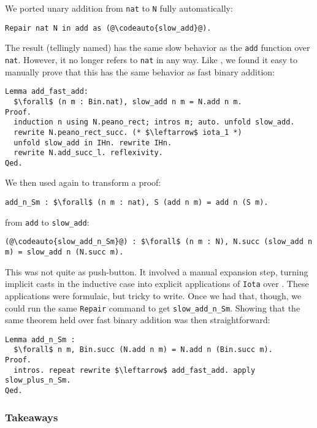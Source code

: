 We ported unary addition from \lstinline{nat} to \lstinline{N} fully automatically:

\begin{lstlisting}
Repair nat N in add as (@\codeauto{slow_add}@).
\end{lstlisting}
The result (tellingly named) has the same slow behavior as the \lstinline{add} function over \lstinline{nat}.
However, it no longer refers to \lstinline{nat} in any way.
Like \citet{magaud2000changing}, we found it easy to manually prove that
this has the same behavior as fast binary addition:

\begin{lstlisting}
Lemma add_fast_add:
  $\forall$ (n m : Bin.nat), slow_add n m = N.add n m.
Proof.
  induction n using N.peano_rect; intros m; auto. unfold slow_add.
  rewrite N.peano_rect_succ. (* $\leftarrow$ iota_1 *)
  unfold slow_add in IHn. rewrite IHn.
  rewrite N.add_succ_l. reflexivity.
Qed.
\end{lstlisting}

We then used \toolname again to transform a proof:
\begin{lstlisting}
add_n_Sm : $\forall$ (n m : nat), S (add n m) = add n (S m).
\end{lstlisting}
from \lstinline{add} to \lstinline{slow_add}:

\begin{lstlisting}
(@\codeauto{slow_add_n_Sm}@) : $\forall$ (n m : N), N.succ (slow_add n m) = slow_add n (N.succ m).
\end{lstlisting}
This was not quite as push-button.
It involved a manual expansion step, turning implicit casts in the inductive case
into explicit applications of \lstinline{Iota} over \A.
These applications were formulaic, but tricky to write.
Once we had that, though, we could run the same \lstinline{Repair} command
to get \lstinline{slow_add_n_Sm}.
Showing that the same theorem held over fast binary addition was then
straightforward:

\begin{lstlisting}
Lemma add_n_Sm :
  $\forall$ n m, Bin.succ (N.add n m) = N.add n (Bin.succ m).
Proof.
  intros. repeat rewrite $\leftarrow$ add_fast_add. apply slow_plus_n_Sm.
Qed.
\end{lstlisting}

\subsubsection{Takeaways}

